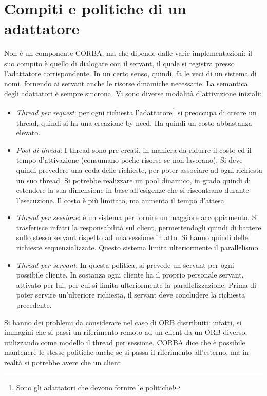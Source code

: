 \section{Compiti e politiche di un adattatore}
Non è un componente CORBA, ma che dipende dalle varie implementazioni: il suo compito è quello di dialogare con il
servant, il quale si registra presso l'adattatore corrispondente. In un certo senso, quindi, fa le veci di un sistema
di nomi, fornendo ai servant anche le risorse dinamiche necessarie.
La semantica degli adattatori è sempre sincrona. Vi sono diverse modalità d'attivazione iniziali:
\begin{itemize}
 \item \textit{Thread per request}: per ogni richiesta l'adattatore\footnote{Sono gli adattatori che devono fornire le
 politiche!} si preoccupa di creare un thread, quindi  si ha una creazione by-need. Ha quindi un costo abbastanza
 elevato.
 \item \textit{Pool di thread}: I thread sono pre-creati, in maniera da ridurre il costo ed il tempo d'attivazione (consumano poche
 risorse se non lavorano). Si deve quindi prevedere una coda delle richieste, per poter associare ad ogni richiesta un
 suo thread. Si potrebbe realizzare un pool dinamico, in grado quindi di estendere la sua dimensione in base
 all'esigenze che si riscontrano durante l'esecuzione. Il costo è più limitato, ma aumenta il tempo d'attesa.
 \item \textit{Thread per sessione}: è un sistema per fornire un maggiore accoppiamento. Si trasferisce infatti la
 responsabilità sul client, permettendogli quindi di battere sullo stesso servant rispetto ad una sessione in atto. Si hanno
 quindi delle richieste sequenzializzate. Questo sistema limita ulteriormente il parallelismo.
 \item \textit{Thread per servant}: In questa politica, si prevede un servant per ogni possibile cliente. In sostanza ogni cliente ha il proprio personale servant, attivato per lui, per cui si limita
 ulteriormente la parallelizzazione. Prima di poter servire un'ulteriore richiesta, il servant deve concludere la
 richiesta precedente.
\end{itemize}
Si hanno dei problemi da considerare nel caso di ORB distribuiti: infatti, si immagini che si passi un riferimento
remoto ad un client da un ORB diverso, utilizzando come modello il thread per sessione. CORBA dice che è possibile
mantenere le stesse politiche anche se si passa il riferimento all'esterno, ma in realtà si potrebbe avere che un client
